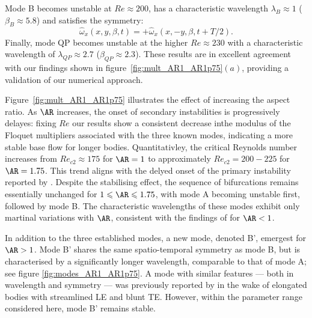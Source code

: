 %
Mode B becomes unstable at $Re \approx 200$, has a characteristic wavelength $\lambda_B \approx 1$ ($\beta_B \approx 5.8$) and satisfies the symmetry:
%
\begin{equation}
  \hat{\omega}_x(x,y,\beta,t) = + \hat{\omega}_x(x,-y,\beta,t+T/2).
\end{equation}
%
Finally, mode QP becomes unstable at the higher $Re \approx 230$ with a characteristic wavelength of $\lambda_{QP} \approx 2.7$ ($\beta_{QP} \approx 2.3$). These results are in excellent agreement with our findings shown in figure~\ref{fig:mult_AR1_AR1p75}$(a)$, providing a validation of our numerical approach.

Figure~\ref{fig:mult_AR1_AR1p75} illustrates the effect of increasing the aspect ratio. As $\AR$ increases, the onset of secondary instabilities is progressively delayes: fixing $Re$ our results show a consistent decrease inthe modulus of the Floquet multipliers associated with the three known modes, indicating a more stable base flow for longer bodies. Quantitativley, the critical Reynolds number increases from $Re_{c2} \approx 175$ for $\AR=1$ to approximately $Re_{c2} =200-225$ for $\AR=1.75$. This trend aligns with the delyed onset of the primary instability reported by \cite{chiarini-quadrio-auteri-2021}. Despite the stabilising effect, the sequence of bifurcations remains essentially unchanged for $1 \le \AR \le 1.75$, with mode A becoming unstable first, followed by mode B. The characteristic wavelengths of these modes exhibit only martinal variations with $\AR$, consistent with the findings of \cite{choi-yang-2014} for $\AR<1$.

In addition to the three established modes, a new mode, denoted B', emergest for $\AR>1$. Mode B' shares the same spatio-temporal symmetry as mode B, but is characterised by a significantly longer wavelength, comparable to that of mode A; see figure \ref{fig:modes_AR1_AR1p75}. A mode with similar features --- both in wavelength and symmetry --- was previously reported by \cite{ryan-etal-2006} in the wake of elongated bodies with streamlined LE and blunt TE. However, within the parameter range considered here, mode B' remains stable.

